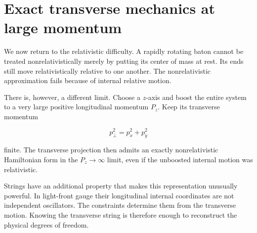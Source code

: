 \section{Exact transverse mechanics at large momentum}

We now return to the relativistic difficulty. A rapidly rotating baton cannot
be treated nonrelativistically merely by putting its center of mass at rest.
Its ends still move relativistically relative to one another. The
nonrelativistic approximation fails because of internal relative motion.

There is, however, a different limit. Choose a \(z\)-axis and boost the entire
system to a very large positive longitudinal momentum \(P_z\). Keep its
transverse momentum

\begin{equation}
  p_\perp^2=p_x^2+p_y^2
\end{equation}

finite. The transverse projection then admits an exactly nonrelativistic
Hamiltonian form in the \(P_z\to\infty\) limit, even if the unboosted internal
motion was relativistic.

\begin{classroomqa}
\end{classroomqa}

\begin{classroomqa}
\end{classroomqa}

Strings have an additional property that makes this representation unusually
powerful. In light-front gauge their longitudinal internal coordinates are
not independent oscillators. The constraints determine them from the
transverse motion. Knowing the transverse string is therefore enough to
reconstruct the physical degrees of freedom.

